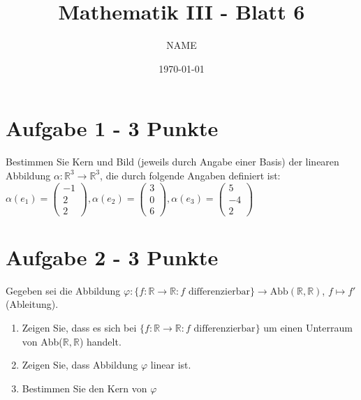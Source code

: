 \documentclass[a4paper]{article}
\author{NAME}
\title{\vspace{-2cm}Mathematik III - Blatt 6}
\date{\today{}}
\begin{document}
        
\maketitle

\section*{Aufgabe 1 - 3 Punkte}

 Bestimmen Sie Kern und Bild (jeweils durch Angabe einer Basis) der linearen Abbildung $\alpha: \mathbb{R}^3 \rightarrow \mathbb{R}^3$, die durch folgende Angaben definiert ist:\\
 $\alpha(e_1) = \begin{pmatrix}  -1 \\ 2 \\ 2  \end{pmatrix}, 
 \alpha(e_2) = \begin{pmatrix}  3\\ 0 \\ 6  \end{pmatrix}, 
 \alpha(e_3) = \begin{pmatrix}  5 \\ -4 \\ 2  \end{pmatrix}$\\
 

\section*{Aufgabe 2 - 3 Punkte}
Gegeben sei die Abbildung $\varphi: \{f:\mathbb{R} \rightarrow \mathbb{R}:f \text{ differenzierbar} \} \rightarrow \text{Abb}(\mathbb{R}, \mathbb{R})$, $f \mapsto f'$(Ableitung).
  \begin{enumerate}[label=(\alph*)]
\item Zeigen Sie, dass es sich bei $ \{f:\mathbb{R} \rightarrow \mathbb{R}:f \text{ differenzierbar} \}$ um einen Unterraum von Abb($\mathbb{R},\mathbb{R}$) handelt.
    \item Zeigen Sie, dass Abbildung $\varphi$ linear ist.
    \item Bestimmen Sie den Kern von $\varphi$
 \end{enumerate}
\end{document}
